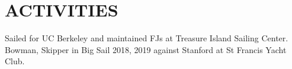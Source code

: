 \documentclass[10pt]{article}
\begin{document}
\section*{ACTIVITIES}

        {Sailed for UC Berkeley and maintained FJs at Treasure Island Sailing Center. 
        Bowman, Skipper in Big Sail 2018, 2019 against Stanford at St Francis Yacht Club.}
\end{document}
